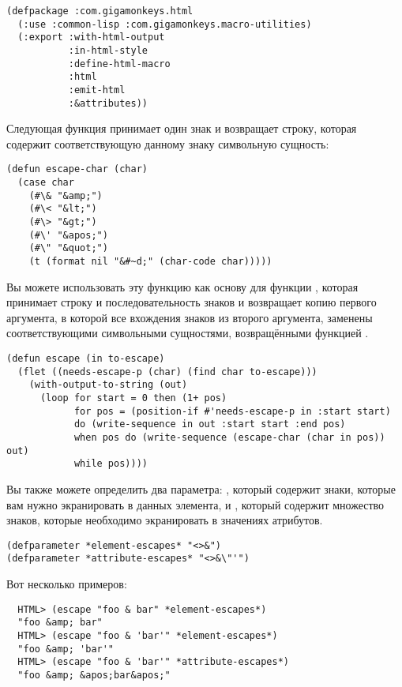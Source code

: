 \begin{lstlisting}
(defpackage :com.gigamonkeys.html
  (:use :common-lisp :com.gigamonkeys.macro-utilities)
  (:export :with-html-output
           :in-html-style
           :define-html-macro
           :html
           :emit-html
           :&attributes))
\end{lstlisting}


Следующая функция принимает один знак и возвращает строку, которая содержит
соответствующую данному знаку символьную сущность:

\begin{lstlisting}
(defun escape-char (char)
  (case char
    (#\& "&amp;")
    (#\< "&lt;")
    (#\> "&gt;")
    (#\' "&apos;")
    (#\" "&quot;")
    (t (format nil "&#~d;" (char-code char)))))
\end{lstlisting}

Вы можете использовать эту функцию как основу для функции , которая принимает
строку и последовательность знаков и возвращает копию первого аргумента, в которой все
вхождения знаков из второго аргумента, заменены соответствующими символьными сущностями,
возвращёнными функцией .

\begin{lstlisting}
(defun escape (in to-escape)
  (flet ((needs-escape-p (char) (find char to-escape)))
    (with-output-to-string (out)
      (loop for start = 0 then (1+ pos)
            for pos = (position-if #'needs-escape-p in :start start)
            do (write-sequence in out :start start :end pos)
            when pos do (write-sequence (escape-char (char in pos)) out)
            while pos))))
\end{lstlisting}

Вы также можете определить два параметра: , который содержит
знаки, которые вам нужно экранировать в данных элемента, и ,
который содержит множество знаков, которые необходимо экранировать в значениях атрибутов.

\begin{lstlisting}
(defparameter *element-escapes* "<>&")
(defparameter *attribute-escapes* "<>&\"'")
\end{lstlisting}

Вот несколько примеров:

\begin{verbatim}
  HTML> (escape "foo & bar" *element-escapes*)
  "foo &amp; bar"
  HTML> (escape "foo & 'bar'" *element-escapes*)
  "foo &amp; 'bar'"
  HTML> (escape "foo & 'bar'" *attribute-escapes*)
  "foo &amp; &apos;bar&apos;"
\end{verbatim}

